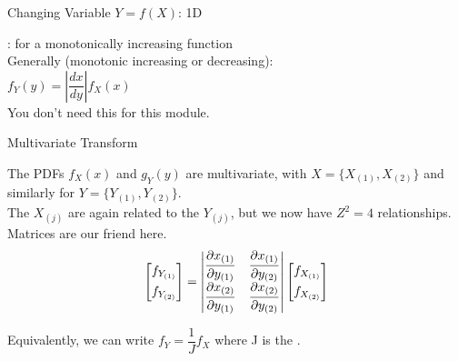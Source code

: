 \documentclass[10pt,sans,english,compress,table,xcolor=dvipsnames]{beamer}
\begin{document}
\begin{frame}{Changing Variable $Y = f(X)$: 1D}

 : for a monotonically increasing function \\[1ex]

Generally (monotonic increasing or decreasing):\\[1ex]

$f_Y(y) = \left|\dfrac{dx}{dy} \right| f_X(x)$\\[1ex]

 You don't need this for this module.

\end{frame}


\begin{frame}{Multivariate Transform}

The PDFs $f_X(x)$ and $g_Y(y)$ are multivariate, with $X= \{ X_{(1)}, X_{(2)}   \}$ and similarly for $Y= \{ Y_{(1)}, Y_{(2)} \}$.\\[1ex]

The $X_{(j)}$ are again related to the $Y_{(j)}$, but we now have $Z^2 = 4 $ relationships. Matrices are our friend here.\\

\begin{align*}
\begin{bmatrix}
f_{ Y_{(1)} } \\[1ex]
f_{ Y_{(2)} } \\
\end{bmatrix}
=
\begin{vmatrix}
\dfrac{\partial x_{(1)}}{\partial y_{(1)}} & \dfrac{\partial x_{(1)} }{\partial y_{(2)}} \\[1ex]
\dfrac{\partial x_{(2)} }{\partial y_{(1)}} & \dfrac{\partial x_{(2)} }{\partial y_{(2)}} \\[1ex]
\end{vmatrix}
\begin{bmatrix}
f_{ X_{(1)} } \\[1ex]
f_{ X_{(2)} } \\
\end{bmatrix}
\end{align*}


Equivalently, we can write $f_Y = \dfrac{1}{J} f_X$ where J is the .
\end{frame}
\end{document}
